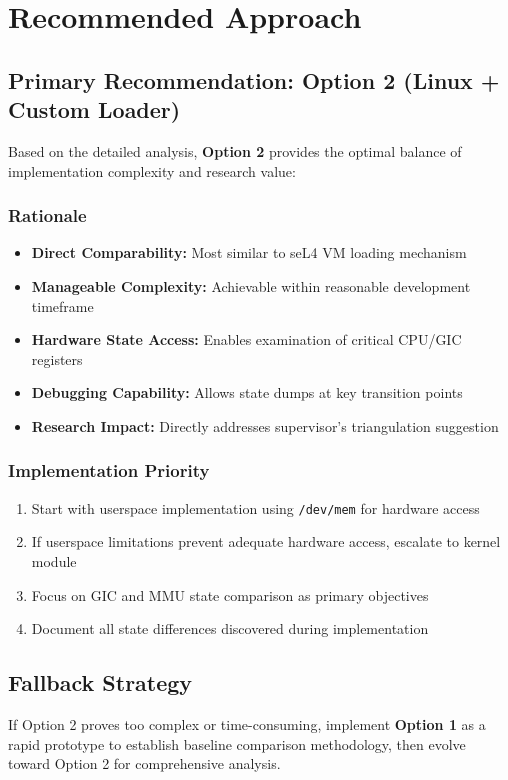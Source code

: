 \documentclass[11pt,a4paper]{article}
\begin{document}
\section{Recommended Approach}

\subsection{Primary Recommendation: Option 2 (Linux + Custom Loader)}

Based on the detailed analysis, \textbf{Option 2} provides the optimal balance of implementation complexity and research value:

\subsubsection{Rationale}
\begin{itemize}
    \item \textbf{Direct Comparability:} Most similar to seL4 VM loading mechanism
    \item \textbf{Manageable Complexity:} Achievable within reasonable development timeframe
    \item \textbf{Hardware State Access:} Enables examination of critical CPU/GIC registers
    \item \textbf{Debugging Capability:} Allows state dumps at key transition points
    \item \textbf{Research Impact:} Directly addresses supervisor's triangulation suggestion
\end{itemize}

\subsubsection{Implementation Priority}
\begin{enumerate}
    \item Start with userspace implementation using \texttt{/dev/mem} for hardware access
    \item If userspace limitations prevent adequate hardware access, escalate to kernel module
    \item Focus on GIC and MMU state comparison as primary objectives
    \item Document all state differences discovered during implementation
\end{enumerate}

\subsection{Fallback Strategy}
If Option 2 proves too complex or time-consuming, implement \textbf{Option 1} as a rapid prototype to establish baseline comparison methodology, then evolve toward Option 2 for comprehensive analysis.
\end{document}
